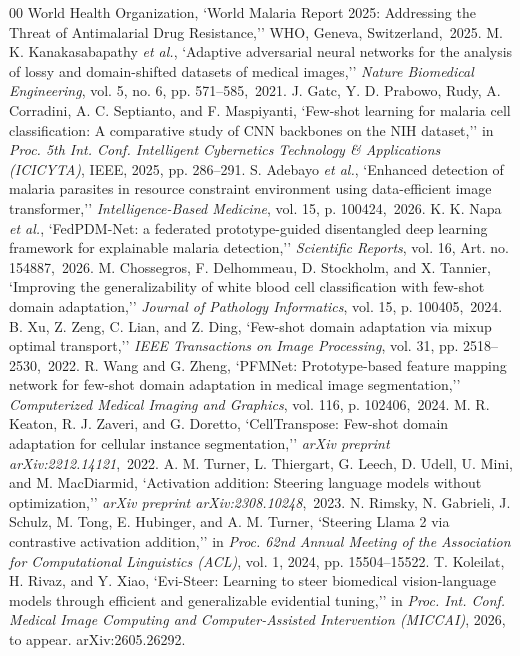 \documentclass[conference]{IEEEtran}
\begin{document}
\renewcommand{\refname}{REFERENSI}
\begin{thebibliography}{00}
 World Health Organization, `World Malaria Report 2025: Addressing the Threat of Antimalarial Drug Resistance,'' WHO, Geneva, Switzerland,~2025.
 M. K. Kanakasabapathy \textit{et al.}, `Adaptive adversarial neural networks for the analysis of lossy and domain-shifted datasets of medical images,'' \textit{Nature Biomedical Engineering}, vol. 5, no. 6, pp. 571--585,~2021.
 J. Gatc, Y. D. Prabowo, Rudy, A. Corradini, A. C. Septianto, and F. Maspiyanti, `Few-shot learning for malaria cell classification: A comparative study of CNN backbones on the NIH dataset,'' in \textit{Proc. 5th Int. Conf. Intelligent Cybernetics Technology \& Applications (ICICYTA)}, IEEE, 2025, pp. 286--291.
 S. Adebayo \textit{et al.}, `Enhanced detection of malaria parasites in resource constraint environment using data-efficient image transformer,'' \textit{Intelligence-Based Medicine}, vol. 15, p. 100424,~2026.
 K. K. Napa \textit{et al.}, `FedPDM-Net: a federated prototype-guided disentangled deep learning framework for explainable malaria detection,'' \textit{Scientific Reports}, vol. 16, Art. no. 154887,~2026.
 M. Chossegros, F. Delhommeau, D. Stockholm, and X. Tannier, `Improving the generalizability of white blood cell classification with few-shot domain adaptation,'' \textit{Journal of Pathology Informatics}, vol. 15, p. 100405,~2024.
 B. Xu, Z. Zeng, C. Lian, and Z. Ding, `Few-shot domain adaptation via mixup optimal transport,'' \textit{IEEE Transactions on Image Processing}, vol. 31, pp. 2518--2530,~2022.
 R. Wang and G. Zheng, `PFMNet: Prototype-based feature mapping network for few-shot domain adaptation in medical image segmentation,'' \textit{Computerized Medical Imaging and Graphics}, vol. 116, p. 102406,~2024.
 M. R. Keaton, R. J. Zaveri, and G. Doretto, `CellTranspose: Few-shot domain adaptation for cellular instance segmentation,'' \textit{arXiv preprint arXiv:2212.14121},~2022.
 A. M. Turner, L. Thiergart, G. Leech, D. Udell, U. Mini, and M. MacDiarmid, `Activation addition: Steering language models without optimization,'' \textit{arXiv preprint arXiv:2308.10248},~2023.
 N. Rimsky, N. Gabrieli, J. Schulz, M. Tong, E. Hubinger, and A. M. Turner, `Steering Llama 2 via contrastive activation addition,'' in \textit{Proc. 62nd Annual Meeting of the Association for Computational Linguistics (ACL)}, vol. 1, 2024, pp. 15504--15522.
 T. Koleilat, H. Rivaz, and Y. Xiao, `Evi-Steer: Learning to steer biomedical vision-language models through efficient and generalizable evidential tuning,'' in \textit{Proc. Int. Conf. Medical Image Computing and Computer-Assisted Intervention (MICCAI)}, 2026, to appear. arXiv:2605.26292.

\end{thebibliography}
\end{document}

